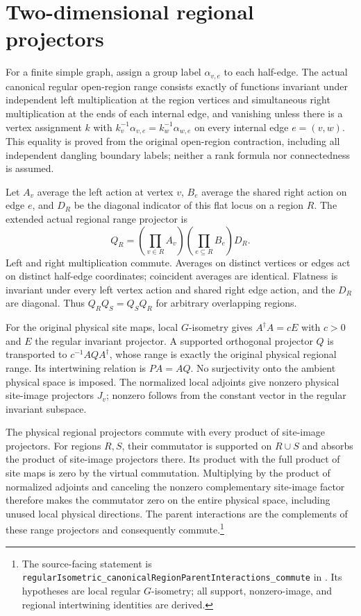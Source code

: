 \documentclass{article}
\begin{document}
\section{Two-dimensional regional projectors}
For a finite simple graph, assign a group label $\alpha_{v,e}$ to each
half-edge. The actual canonical regular open-region range consists exactly
of functions invariant under independent left multiplication at the region
vertices and simultaneous right multiplication at the ends of each internal
edge, and vanishing unless there is a vertex assignment $k$ with
$k_v^{-1}\alpha_{v,e}=k_w^{-1}\alpha_{w,e}$ on every internal edge $e=(v,w)$.
This equality is proved from the original open-region contraction, including
all independent dangling boundary labels; neither a rank formula nor
connectedness is assumed.

Let $A_v$ average the left action at vertex $v$, $B_e$ average the shared
right action on edge $e$, and $D_R$ be the diagonal indicator of this flat
locus on a region $R$. The extended actual regional range projector is
\[
  Q_R=\left(\prod_{v\in R}A_v\right)
       \left(\prod_{e\subseteq R}B_e\right)D_R.
\]
Left and right multiplication commute. Averages on distinct vertices or
edges act on distinct half-edge coordinates; coincident averages are
identical. Flatness is invariant under every left vertex action and shared
right edge action, and the $D_R$ are diagonal. Thus $Q_RQ_S=Q_SQ_R$ for
arbitrary overlapping regions.

For the original physical site maps, local $G$-isometry gives
$A^\dagger A=cE$ with $c>0$ and $E$ the regular invariant projector.
A supported orthogonal projector $Q$ is transported to
$c^{-1}AQA^\dagger$, whose range is exactly the original physical regional
range. Its intertwining relation is $PA=AQ$.
No surjectivity onto the ambient physical space is imposed. The normalized
local adjoints give nonzero physical site-image projectors $J_v$; nonzero
follows from the constant vector in the regular invariant subspace.

The physical regional projectors commute with every product of site-image
projectors. For regions $R,S$, their commutator is supported on $R\cup S$
and absorbs the product of site-image projectors there. Its product with
the full product of site maps is zero by the virtual commutation. Multiplying
by the product of normalized adjoints and canceling the nonzero complementary
site-image factor therefore makes the commutator zero on the entire physical
space, including unused local physical directions. The parent interactions
are the complements of these range projectors and consequently commute.\footnote{
The source-facing statement is
\texttt{regularIsometric\_canonicalRegionParentInteractions\_commute} in
.
Its hypotheses are local regular $G$-isometry; all support, nonzero-image,
and regional intertwining identities are derived.}
\end{document}
